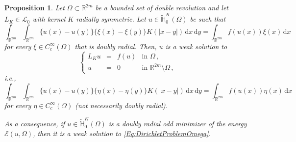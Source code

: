 \documentclass[12pt,reqno]{amsart}
\newtheorem{proposition}[theorem]{Proposition}
\theoremstyle{definition}
\theoremstyle{remark}
\newcommand{\con}[1]{\mathbb{#1}}
\newcommand{\R}{\con{R}} %
\renewcommand{\H}{\con{H}}
\newcommand{\ecal}{\mathcal{E}}
\newcommand{\lcal}{\mathcal{L}}
\renewcommand{\d}{\,\mathrm{d}} %
\newcommand\beqc[1]{\left\{\begin{array}{#1}}
\newcommand\eeqc{\end{array} \right.}
\def\PDEsystem{rcll}
\numberwithin{equation}{section}
\begin{document}
	\begin{proposition}
		\label{Prop:WeakSolutionForAllTestFunctions}
		Let $\Omega \subset \R^{2m}$ be a bounded set of double revolution and let $L_K \in \lcal_0$ with kernel $K$ radially symmetric. Let $u\in \widetilde{\H}^K_{0}(\Omega)$ be such that
		$$
		\int_{\R^{2m}}\int_{\R^{2m}} \{u(x)-u(y)\}\{\xi(x)-\xi(y)\} K(|x-y|) \d x \d y = \int_{\R^{2m}} f(u(x)) \xi(x) \d x
		$$
		for every $\xi \in C^\infty_c(\Omega)$ that is doubly radial. Then, $u$ is a weak solution to
		\begin{equation}
		\label{Eq:DirichletProblemOmega}
		\beqc{\PDEsystem}
		L_K u &=& f(u) & \text{in } \Omega\,,\\
		u &=& 0 & \text{in } \R^{2m}\setminus \Omega\,,
		\eeqc
		\end{equation}
		i.e.,
		$$
		\int_{\R^{2m}}\int_{\R^{2m}} \{u(x)-u(y)\}\{\eta(x)-\eta(y)\} K(|x-y|) \d x \d y = \int_{\R^{2m}} f(u(x)) \eta(x) \d x
		$$
		for every $\eta \in C^\infty_c(\Omega)$ (not necessarily doubly radial).
		
		As a consequence, if $u\in \widetilde{\H}^K_{0}(\Omega)$ is a doubly radial odd minimizer of the energy $\ecal(u,\Omega)$, then it is a weak solution to \eqref{Eq:DirichletProblemOmega}.
	\end{proposition}
	
\end{document}
